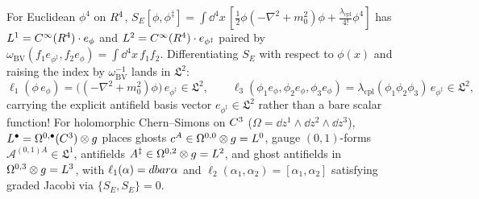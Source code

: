 \begin{example}[{Scalar $\phi^4$ vs.\ Holomorphic Chern--Simons in $\mathfrak{L}^\bullet = \mathcal{E}_{\mathrm{hom}}[1]$}]
\label{ex:bv-phi4-hcs}
For Euclidean $\phi^4$ on $R^4$, $S_E[\phi,\phi^\ddagger] = \int\dd^4x\,[\frac{1}{2}\phi(-\nabla^2 + m_0^2)\phi + \frac{\lambda_{\mathrm{cpl}}}{4!}\phi^4]$ has $L^1 = C^\infty(R^4)\cdot e_\phi$ and $L^2 = C^\infty(R^4)\cdot e_{\phi^\ddagger}$ paired by $\omega_{\mathrm{BV}}(f_1 e_{\phi^\ddagger}, f_2 e_\phi) = \int\dd^4x\,f_1 f_2$. Differentiating $S_E$ with respect to $\phi(x)$ and raising the index by $\omega_{\mathrm{BV}}^{-1}$ lands in $\mathfrak{L}^2$:
\[
\ell_1(\phi\,e_\phi) = \bigl((-\nabla^2 + m_0^2)\phi\bigr)\,e_{\phi^\ddagger} \in \mathfrak{L}^2,\qquad
\ell_3(\phi_1 e_\phi, \phi_2 e_\phi, \phi_3 e_\phi) = \lambda_{\mathrm{cpl}}(\phi_1\phi_2\phi_3)\,e_{\phi^\ddagger} \in \mathfrak{L}^2,
\]
carrying the explicit antifield basis vector $e_{\phi^\ddagger} \in \mathfrak{L}^2$ rather than a bare scalar function! For holomorphic Chern--Simons on $C^3$ ($\Omega = \dd z^1\wedge\dd z^2\wedge\dd z^3$), $L^\bullet = \Omega^{0,\bullet}(C^3)\otimes g$ places ghosts $c^A \in \Omega^{0,0}\otimes g = L^0$, gauge $(0,1)$-forms $\mathcal{A}^{(0,1)A} \in \mathfrak{L}^1$, antifields $A^\ddagger \in \Omega^{0,2}\otimes g = L^2$, and ghost antifields in $\Omega^{0,3}\otimes g = L^3$, with $\ell_1(\alpha) = dbar\alpha$ and $\ell_2(\alpha_1,\alpha_2) = [\alpha_1,\alpha_2]$ satisfying graded Jacobi via $\{S_E, S_E\} = 0$.
\end{example}

